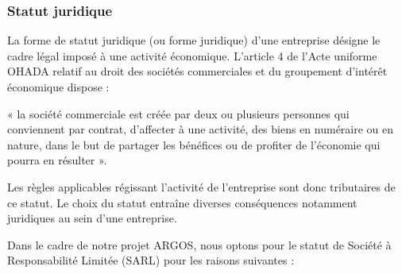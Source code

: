 \subsubsection{Statut juridique}

La forme de statut juridique (ou forme juridique) d'une entreprise désigne le cadre légal imposé à une activité économique. L'article 4 de l'Acte uniforme OHADA relatif au droit des sociétés commerciales et du groupement d'intérêt économique dispose :

« la société commerciale est créée par deux ou plusieurs personnes qui conviennent par contrat, d'affecter à une activité, des biens en numéraire ou en nature, dans le but de partager les bénéfices ou de profiter de l'économie qui pourra en résulter »\cite{ohada_auscgie}.

Les règles applicables régissant l'activité de l'entreprise sont donc tributaires de ce statut. Le choix du statut entraîne diverses conséquences notamment juridiques au sein d'une entreprise.

Dans le cadre de notre projet ARGOS, nous optons pour le statut de Société à Responsabilité Limitée (SARL) pour les raisons suivantes :

